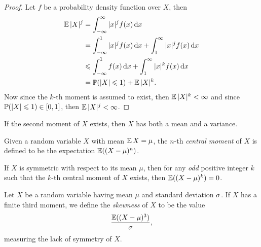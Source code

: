 \begin{proof}
    Let \(f\) be a probability density function over \(X\), then
    \begin{align*}
        \operatorname{\mathbb{E}} |X|^j
         & = \int_{-\infty}^{\infty} |x|^j f(x)\, \mathrm{d} x                              \\
         & = \int_{-\infty}^1 |x|^j f(x)\, \mathrm{d} x
        + \int_1^{\infty} |x|^j f(x)\, \mathrm{d} x                                         \\
         & \leqslant \int_{-\infty}^1 f(x)\, \mathrm{d} x + \int_1^{\infty} |x|^k f(x)\, \mathrm{d} x \\
         & = \operatorname{\mathbb{P}}(|X| \leqslant 1) + \operatorname{\mathbb{E}} |X|^k.
    \end{align*}
    Now since the \(k\)-th moment is assumed to exist, then \(\operatorname{\mathbb{E}} |X|^k < \infty\)
    and since \(\operatorname{\mathbb{P}}(|X| \leqslant 1) \in [0, 1]\), then \(\operatorname{\mathbb{E}} |X|^j < \infty\).
\end{proof}

\begin{corollary}
    \label{cor:snd-moment--existence-mean-and-variance}
    If the second moment of \(X\) exists, then \(X\) has both a mean and a variance.
\end{corollary}

\begin{definition}
    \label{def:central-moment-random-variable}
    Given a random variable \(X\) with mean \(\operatorname{\mathbb{E}} X = \mu\), the \(n\)-th
    \emph{central moment} of \(X\) is defined to be the expectation
    \(\operatorname{\mathbb{E}}((X - \mu)^n)\).
\end{definition}

\begin{corollary}
    \label{cor:symmetric-wrt-mean-has-central-moment-zero}
    If \(X\) is symmetric with respect to its mean \(\mu\), then for any \emph{odd}
    positive integer \(k\) such that the \(k\)-th central moment of \(X\) exists,
    then \(\operatorname{\mathbb{E}}((X - \mu)^k) = 0\).
\end{corollary}

\begin{definition}
    \label{def:random-variable-skewness}
    Let \(X\) be a random variable having mean \(\mu\) and standard deviation
    \(\operatorname{\sigma}\). If \(X\) has a finite third moment, we define the \emph{skewness} of
    \(X\) to be the value
    \[
        \frac{\operatorname{\mathbb{E}}((X - \mu)^3)}{\operatorname{\sigma}},
    \]
    measuring the lack of symmetry of \(X\).
\end{definition}

